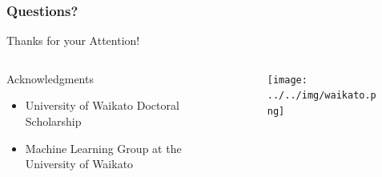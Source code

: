 \documentclass[handout]{beamer}
\begin{document}
\begin{frame}
\frametitle{Questions?}
\begin{center}\LARGE Thanks for your Attention!\\ \end{center}

\begin{columns}
\begin{column}{0.55\textwidth}
\begin{block}{Acknowledgments}
\begin{itemize}\tiny
	\item University of Waikato Doctoral Scholarship
	\item Machine Learning Group at the University of Waikato
	
\end{itemize}
\end{block}
\end{column}
\begin{column}{0.45\textwidth}
\vspace{1.5cm}

\begin{figure}[h!]
	\centering
	\texttt{[image: ../../img/waikato.png]}
\end{figure}
\end{column}
\end{columns}

\end{frame}




\end{document}
